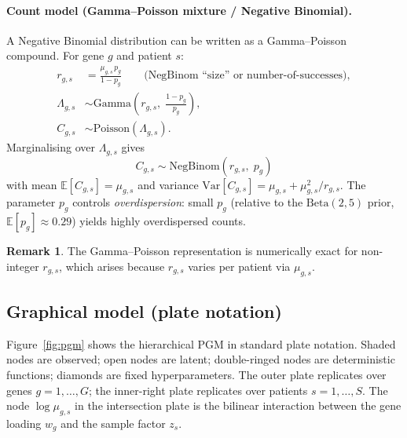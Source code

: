 \documentclass[11pt,a4paper]{article}
\newcommand{\E}{\mathbb{E}}
\newcommand{\Var}{\mathrm{Var}}
\newcommand{\NB}{\mathrm{NegBinom}}
\newcommand{\Beta}{\mathrm{Beta}}
\renewcommand{\Gamma}{\mathrm{Gamma}}
\newcommand{\Poisson}{\mathrm{Poisson}}
\theoremstyle{definition}
\newtheorem{remark}{Remark}
\begin{document}
\paragraph{Count model (Gamma--Poisson mixture / Negative Binomial).}
A Negative Binomial distribution can be written as a Gamma--Poisson
compound. For gene $g$ and patient $s$:
\begin{align}
  r_{g,s} &= \frac{\mu_{g,s}\, p_g}{1 - p_g}
             \qquad \text{(NegBinom ``size'' or number-of-successes)},
             \label{eq:r}\\
  \Lambda_{g,s} &\sim \Gamma\!\left(r_{g,s},\;\frac{1-p_g}{p_g}\right),
             \label{eq:gamma}\\
  C_{g,s} &\sim \Poisson(\Lambda_{g,s}). \label{eq:poisson}
\end{align}
Marginalising over $\Lambda_{g,s}$ gives
\begin{equation}
  C_{g,s} \sim \NB\!\left(r_{g,s},\; p_g\right)
\end{equation}
with mean $\E[C_{g,s}] = \mu_{g,s}$ and variance
$\Var[C_{g,s}] = \mu_{g,s} + \mu_{g,s}^2 / r_{g,s}$.
The parameter $p_g$ controls \emph{overdispersion}: small $p_g$ (relative
to the $\Beta(2,5)$ prior, $\E[p_g] \approx 0.29$) yields highly
overdispersed counts.

\begin{remark}
The Gamma--Poisson representation is numerically exact for non-integer
$r_{g,s}$, which arises because $r_{g,s}$ varies per patient via $\mu_{g,s}$.
\end{remark}

\subsection{Graphical model (plate notation)}
\label{sec:pgm_plate}

Figure~\ref{fig:pgm} shows the hierarchical PGM in standard plate notation.
Shaded nodes are observed; open nodes are latent; double-ringed nodes are
deterministic functions; diamonds are fixed hyperparameters.
The outer plate replicates over genes $g = 1,\ldots,G$;
the inner-right plate replicates over patients $s = 1,\ldots,S$.
The node $\log\mu_{g,s}$ in the intersection plate is the bilinear
interaction between the gene loading $w_g$ and the sample factor $z_s$.
\end{document}
